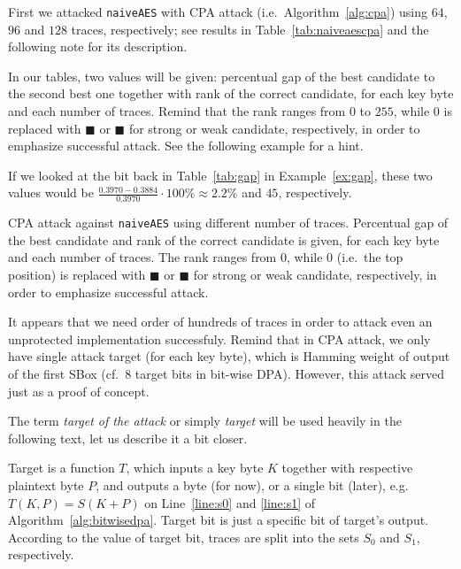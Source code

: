 	First we attacked {\tt naiveAES} with CPA attack (i.e.\ Algorithm~\ref{alg:cpa}) using $64$, $96$ and $128$ traces, respectively; see results in Table~\ref{tab:naiveaescpa} and the following note for its description.
	
	\begin{note}
	\label{note:tabvals}
		In our tables, two values will be given: percentual gap of the best candidate to the second best one together with rank of the correct candidate, for each key byte and each number of traces. Remind that the rank ranges from $0$ to $255$, while $0$ is replaced with $\blacksquare$ or {\weak$\blacksquare$} for strong or weak candidate, respectively, in order to emphasize successful attack. See the following example for a hint.
	\end{note}
	
	\begin{example}
	\label{ex:gaprank}
		If we looked at the  bit back in Table~\ref{tab:gap} in Example~\ref{ex:gap}, these two values would be $\frac{0.3970-0.3884}{0.3970}\cdot100\%\approx2.2\%$ and $45$, respectively.
	\end{example}
	
	\begin{table}[h]
		\begin{center}
		
		\end{center}
	\caption{CPA attack against {\tt naiveAES} using different number of traces. Percentual gap of the best candidate and rank of the correct candidate is given, for each key byte and each number of traces. The rank ranges from $0$, while $0$ (i.e.\ the top position) is replaced with $\blacksquare$ or {\weak$\blacksquare$} for strong or weak candidate, respectively, in order to emphasize successful attack.}
	\label{tab:naiveaescpa}
	\end{table}
	
	It appears that we need order of hundreds of traces in order to attack even an unprotected implementation successfuly. Remind that in CPA attack, we only have single attack target (for each key byte), which is Hamming weight of output of the first SBox (cf.\ $8$ target bits in bit-wise DPA). However, this attack served just as a proof of concept.
	
	\begin{note}
	\label{note:target}
		The term {\em target of the attack} or simply {\em target} will be used heavily in the following text, let us describe it a bit closer.
		
		Target is a function $T$, which inputs a key byte $K$ together with respective plaintext byte $P$, and outputs a byte (for now), or a single bit (later), e.g.\ $T(K,P) = S(K+P)$ on Line~\ref{line:s0} and \ref{line:s1} of Algorithm~\ref{alg:bitwisedpa}. Target bit is just a specific bit of target's output. According to the value of target bit, traces are split into the sets $S_0$ and $S_1$, respectively.
	\end{note}

